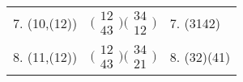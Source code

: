 \documentclass{surv-l}
\numberwithin{equation}{section}
\numberwithin{table}{section}
\numberwithin{figure}{section}
\theoremstyle{definition}
\begin{document}
\begin{table}
{\begin{tabular}{|l|l|l|}
7. (10,(12))&$\big(\!\begin{smallmatrix}12\\ 43\end{smallmatrix}\!\big) \big(\!\begin{smallmatrix}34\\ 12\end{smallmatrix}\!\big)$&7. (3142)\\[3pt]
8. (11,(12)) &$\big(\!\begin{smallmatrix}12\\ 43\end{smallmatrix}\!\big) \big(\!\begin{smallmatrix}34\\ 21\end{smallmatrix}\!\big)$&8. (32)(41) \\[3pt]
\hline
\end{tabular}}{}
\end{table}
\end{document}
